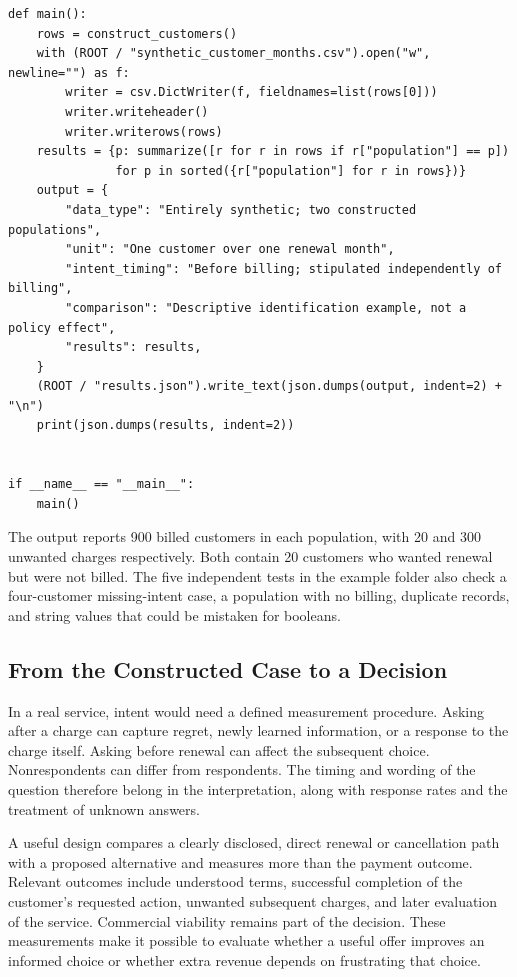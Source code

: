 \begin{Verbatim}[breaklines,breakanywhere,fontsize=\small]
def main():
    rows = construct_customers()
    with (ROOT / "synthetic_customer_months.csv").open("w", newline="") as f:
        writer = csv.DictWriter(f, fieldnames=list(rows[0]))
        writer.writeheader()
        writer.writerows(rows)
    results = {p: summarize([r for r in rows if r["population"] == p])
               for p in sorted({r["population"] for r in rows})}
    output = {
        "data_type": "Entirely synthetic; two constructed populations",
        "unit": "One customer over one renewal month",
        "intent_timing": "Before billing; stipulated independently of billing",
        "comparison": "Descriptive identification example, not a policy effect",
        "results": results,
    }
    (ROOT / "results.json").write_text(json.dumps(output, indent=2) + "\n")
    print(json.dumps(results, indent=2))


if __name__ == "__main__":
    main()
\end{Verbatim}

The output reports 900 billed customers in each population, with 20 and
300 unwanted charges respectively. Both contain 20 customers who wanted
renewal but were not billed. The five independent tests in the example
folder also check a four-customer missing-intent case, a population with
no billing, duplicate records, and string values that could be mistaken
for booleans.

\hypertarget{M09-from-the-constructed-case-to-a-decision}{%
\subsection{From the Constructed Case to a
Decision}\label{M09-from-the-constructed-case-to-a-decision}}

\noindent \noindent In a real service, intent would need a defined measurement
procedure. Asking after a charge can capture regret, newly learned
information, or a response to the charge itself. Asking before renewal
can affect the subsequent choice. Nonrespondents can differ from
respondents. The timing and wording of the question therefore belong in
the interpretation, along with response rates and the treatment of
unknown answers.

A useful design compares a clearly disclosed, direct renewal or
cancellation path with a proposed alternative and measures more than the
payment outcome. Relevant outcomes include understood terms, successful
completion of the customer's requested action, unwanted subsequent
charges, and later evaluation of the service. Commercial viability
remains part of the decision. These measurements make it possible to
evaluate whether a useful offer improves an informed choice or whether
extra revenue depends on frustrating that choice.

